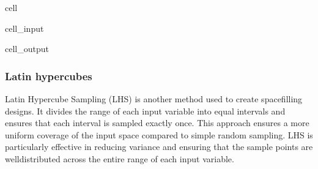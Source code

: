 \documentclass[letterpaper,10pt,english]{jupyterBook}
\begin{document}
\begin{sphinxuseclass}{cell}
\begin{sphinxVerbatimInput}
\begin{sphinxuseclass}{cell_input}
\end{sphinxuseclass}\end{sphinxVerbatimInput}
\begin{sphinxVerbatimOutput}

\begin{sphinxuseclass}{cell_output}
\noindent{}

\end{sphinxuseclass}\end{sphinxVerbatimOutput}

\end{sphinxuseclass}

\subsubsection{Latin hypercubes}
\label{\detokenize{notebooks/design_of_experiments:latin-hypercubes}}
\sphinxAtStartPar
Latin Hypercube Sampling (LHS) is another method used to create space\sphinxhyphen{}filling designs. It divides the range of each input variable into equal intervals and ensures that each interval is sampled exactly once. This approach ensures a more uniform coverage of the input space compared to simple random sampling. LHS is particularly effective in reducing variance and ensuring that the sample points are well\sphinxhyphen{}distributed across the entire range of each input variable.
\end{document}
